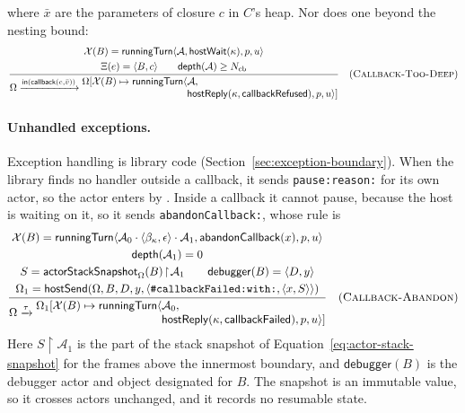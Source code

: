 where $\bar x$ are the parameters of closure $c$ in $C$'s heap.  Nor does one
beyond the nesting bound:
\[
\dfrac{\begin{gathered}
 \mathcal X(B)=\mathsf{runningTurn}\langle\mathcal A,\mathsf{hostWait}(\kappa),p,u\rangle\\
 \Xi(e)=\langle B,c\rangle\qquad \mathsf{depth}(\mathcal A)\ge N_{\mathrm{cb}}
 \end{gathered}}
 {\Omega\xrightarrow{\mathsf{in}(\mathsf{callback}(e,\bar v))}
  \begin{aligned}\Omega[\mathcal X(B)\mapsto\mathsf{runningTurn}\langle
     &\mathcal A,\\[-1mm]
     &\mathsf{hostReply}(\kappa,\mathsf{callbackRefused}),p,u\rangle]
  \end{aligned}}
\quad(\textsc{Callback-Too-Deep})
\]

\paragraph{Unhandled exceptions.}
Exception handling is library code (Section~\ref{sec:exception-boundary}).
When the library finds no handler outside a callback, it sends
\texttt{pause:reason:} for its own actor, so the actor enters 
by .  Inside a callback it cannot pause, because the host is
waiting on it, so it sends \texttt{abandonCallback:}, whose rule is
\[
\dfrac{\begin{gathered}
 \mathcal X(B)=\mathsf{runningTurn}\langle
   \mathcal A_0\cdot\langle\beta_\kappa,\epsilon\rangle\cdot\mathcal A_1,
   \mathsf{abandonCallback}(x),p,u\rangle\\
 \mathsf{depth}(\mathcal A_1)=0\\
 S=\mathsf{actorStackSnapshot}_{\Omega}(B)\!\upharpoonright\!\mathcal A_1
 \qquad\mathsf{debugger}(B)=\langle D,y\rangle\\
 \Omega_1=\mathsf{hostSend}(\Omega,B,D,y,
   \langle\text{\texttt{\#callbackFailed:with:}},\langle x,S\rangle\rangle)
 \end{gathered}}
 {\Omega\xrightarrow{\tau}
  \begin{aligned}\Omega_1[\mathcal X(B)\mapsto\mathsf{runningTurn}\langle
     &\mathcal A_0,\\[-1mm]
     &\mathsf{hostReply}(\kappa,\mathsf{callbackFailed}),p,u\rangle]
  \end{aligned}}
\quad(\textsc{Callback-Abandon})
\]
Here $S\!\upharpoonright\!\mathcal A_1$ is the part of the stack snapshot of
Equation~\eqref{eq:actor-stack-snapshot} for the frames above the innermost
boundary, and $\mathsf{debugger}(B)$ is the debugger actor and object
designated for $B$.  The snapshot is an immutable value, so it crosses actors
unchanged, and it records no resumable state.

